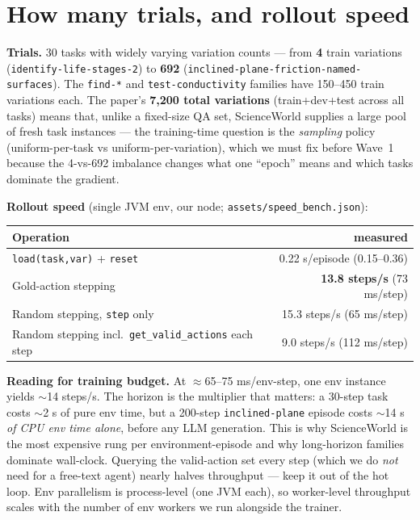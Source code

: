 \documentclass[10pt]{article}
\newcommand{\cmd}[1]{\texttt{\small #1}}
\begin{document}
\section{How many trials, and rollout speed}
\textbf{Trials.} 30 tasks with widely varying variation counts --- from \textbf{4} train variations
(\cmd{identify-life-stages-2}) to \textbf{692} (\cmd{inclined-plane-friction-named-surfaces}). The
\cmd{find-*} and \cmd{test-conductivity} families have 150--450 train variations each. The paper's
\textbf{7{,}200 total variations} (train+dev+test across all tasks) means that, unlike a fixed-size QA
set, ScienceWorld supplies a large pool of fresh task instances --- the training-time question is the
\emph{sampling} policy (uniform-per-task vs uniform-per-variation), which we must fix before Wave~1 because
the 4-vs-692 imbalance changes what one ``epoch'' means and which tasks dominate the gradient.

\smallskip
\noindent\textbf{Rollout speed} (single JVM env, our node; \cmd{assets/speed\_bench.json}):
\begin{center}\small
\begin{tabular}{lr}
\toprule
Operation & measured \\
\midrule
\cmd{load(task,var)} + \cmd{reset} & 0.22 s/episode (0.15--0.36) \\
Gold-action stepping & \textbf{13.8 steps/s} (73 ms/step) \\
Random stepping, \cmd{step} only & 15.3 steps/s (65 ms/step) \\
Random stepping incl.\ \cmd{get\_valid\_actions} each step & 9.0 steps/s (112 ms/step) \\
\bottomrule
\end{tabular}
\end{center}

\noindent\textbf{Reading for training budget.} At $\approx$65--75 ms/env-step, one env instance yields
$\sim$14 steps/s. The horizon is the multiplier that matters: a 30-step task costs $\sim$2 s of pure env
time, but a 200-step \cmd{inclined-plane} episode costs $\sim$14 s \emph{of CPU env time alone}, before any
LLM generation. This is why ScienceWorld is the most expensive rung per environment-episode and why
long-horizon families dominate wall-clock. Querying the valid-action set every step (which we do
\emph{not} need for a free-text agent) nearly halves throughput --- keep it out of the hot loop. Env
parallelism is process-level (one JVM each), so worker-level throughput scales with the number of env
workers we run alongside the trainer.
\end{document}
